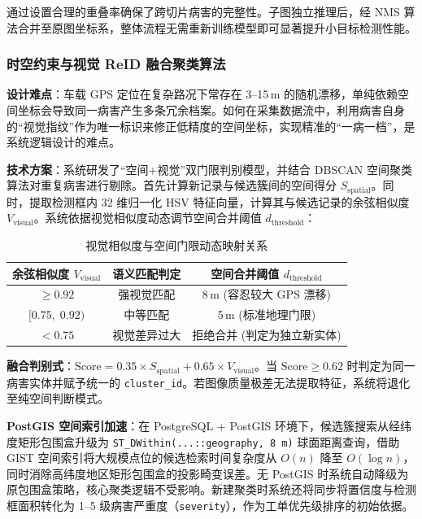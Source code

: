 \documentclass[UTF8, a4paper, fontset=ubuntu]{ctexart}
\begin{document}
通过设置合理的重叠率确保了跨切片病害的完整性。子图独立推理后，经 NMS 算法合并至原图坐标系，整体流程无需重新训练模型即可显著提升小目标检测性能。

\subsubsection{时空约束与视觉 ReID 融合聚类算法}

\textbf{设计难点}：车载 GPS 定位在复杂路况下常存在 3--15\,m 的随机漂移，单纯依赖空间坐标会导致同一病害产生多条冗余档案。如何在采集数据流中，利用病害自身的“视觉指纹”作为唯一标识来修正低精度的空间坐标，实现精准的“一病一档”，是系统逻辑设计的难点。

\textbf{技术方案}：系统研发了“空间+视觉”双门限判别模型，并结合 DBSCAN 空间聚类算法\cite{ester1996dbscan}对重复病害进行剔除。首先计算新记录与候选簇间的空间得分 $S_{\text{spatial}}$。同时，提取检测框内 32 维归一化 HSV 特征向量，计算其与候选记录的余弦相似度 $V_{\text{visual}}$。系统依据视觉相似度动态调节空间合并阈值 $d_{\text{threshold}}$：

\begin{table}[H]
\centering
{}
\caption{视觉相似度与空间门限动态映射关系}
\begin{tabular}{ccc}
\toprule
余弦相似度 $V_{\text{visual}}$ & 语义匹配判定 & 空间合并阈值 $d_{\text{threshold}}$ \\ \midrule
$\geq 0.92$ & 强视觉匹配 & 8\,m (容忍较大 GPS 漂移) \\
$[0.75,\; 0.92)$ & 中等匹配 & 5\,m (标准地理门限) \\
$< 0.75$ & 视觉差异过大 & 拒绝合并 (判定为独立新实体) \\ \bottomrule
\end{tabular}
\end{table}

\textbf{融合判别式}：$\text{Score} = 0.35 \times S_{\text{spatial}} + 0.65 \times V_{\text{visual}}$。当 $\text{Score} \geq 0.62$ 时判定为同一病害实体并赋予统一的 \texttt{cluster\_id}。若图像质量极差无法提取特征，系统将退化至纯空间判断模式。

\textbf{PostGIS 空间索引加速}：在 PostgreSQL + PostGIS 环境下，候选簇搜索从经纬度矩形包围盒升级为 \texttt{ST\_DWithin(...::geography, 8\,m)} 球面距离查询，借助 GIST 空间索引将大规模点位的候选检索时间复杂度从 $O(n)$ 降至 $O(\log n)$，同时消除高纬度地区矩形包围盒的投影畸变误差。无 PostGIS 时系统自动降级为原包围盒策略，核心聚类逻辑不受影响。新建聚类时系统还将同步将置信度与检测框面积转化为 1--5 级病害严重度（\texttt{severity}），作为工单优先级排序的初始依据。
\end{document}
